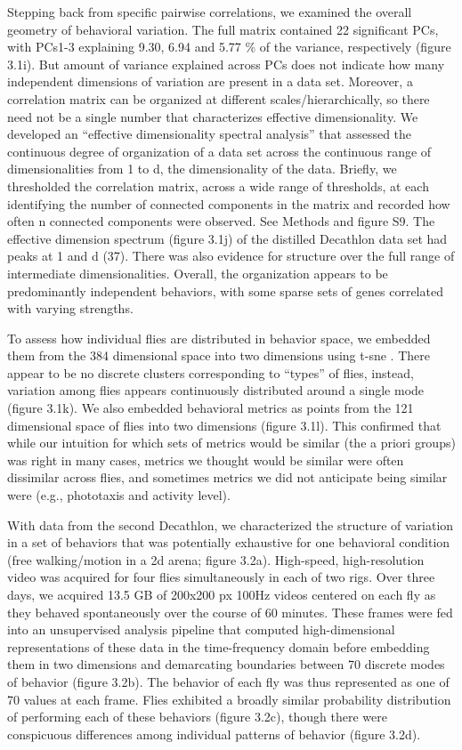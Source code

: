 \documentclass[12pt,letterpaper]{article}
\begin{document}
Stepping back from specific pairwise correlations, we examined the overall geometry of behavioral variation. The full matrix contained 22 significant PCs, with PCs1-3 explaining 9.30, 6.94 and 5.77 \% of the variance, respectively (figure 3.1i). But amount of variance explained across PCs does not indicate how many independent dimensions of variation are present in a data set. Moreover, a correlation matrix can be organized at different scales/hierarchically, so there need not be a single number that characterizes effective dimensionality. We developed an “effective dimensionality spectral analysis” that assessed the continuous degree of organization of a data set across the continuous range of dimensionalities from 1 to d, the dimensionality of the data. Briefly, we thresholded the correlation matrix, across a wide range of thresholds, at each identifying the number of connected components in the matrix and recorded how often n connected components were observed. See Methods and figure S9. The effective dimension spectrum (figure 3.1j) of the distilled Decathlon data set had peaks at 1 and d (37). There was also evidence for structure over the full range of intermediate dimensionalities. Overall, the organization appears to be predominantly independent behaviors, with some sparse sets of genes correlated with varying strengths. 

To assess how individual flies are distributed in behavior space, we embedded them from the 384 dimensional space into two dimensions using t-sne \cite{Maaten_Visualizing_2008}. There appear to be no discrete clusters corresponding to “types” of flies, instead, variation among flies appears continuously distributed around a single mode (figure 3.1k). We also embedded behavioral metrics as points from the 121 dimensional space of flies into two dimensions (figure 3.1l). This confirmed that while our intuition for which sets of metrics would be similar (the a priori groups) was right in many cases, metrics we thought would be similar were often dissimilar across flies, and sometimes metrics we did not anticipate being similar were (e.g., phototaxis and activity level). 

With data from the second Decathlon, we characterized the structure of variation in a set of behaviors that was potentially exhaustive for one behavioral condition (free walking/motion in a 2d arena; figure 3.2a). High-speed, high-resolution video was acquired for four flies simultaneously in each of two rigs. Over three days, we acquired 13.5 GB of 200x200 px 100Hz videos centered on each fly as they behaved spontaneously over the course of 60 minutes. These frames were fed into an unsupervised analysis pipeline \cite{berman_choi_bialek_shaevitz_2014} that computed high-dimensional representations of these data in the time-frequency domain before embedding them in two dimensions and demarcating boundaries between 70 discrete modes of behavior (figure 3.2b). The behavior of each fly was thus represented as one of 70 values at each frame. Flies exhibited a broadly similar probability distribution of performing each of these behaviors (figure 3.2c), though there were conspicuous differences among individual patterns of behavior (figure 3.2d). 
\end{document}

